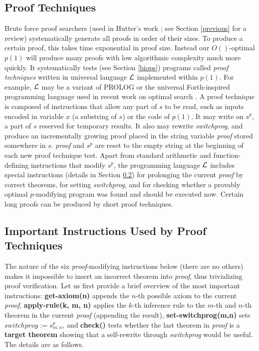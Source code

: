 \subsection{Proof Techniques}
\label{prooftech}
Brute force proof searchers
(used in Hutter's work \cite{Hutter:01aixi+,Hutter:01fast+}; 
see Section \ref{previous} for a review)
systematically generate all proofs
in order of their sizes.  To produce a certain proof,
this takes time exponential in proof size.
Instead our $O()$-optimal $p(1)$ will produce many proofs
with low algorithmic complexity 
\cite{Solomonoff:64,Kolmogorov:65,LiVitanyi:97}
much more quickly. It systematically tests (see Section \ref{biops})
programs called
{\em proof techniques} written in universal language
$\cal L$ implemented within $p(1)$.  
For example, $\cal L$  may be a variant of PROLOG \cite{Prolog:87}
or the universal {\sc Forth}\cite{Forth:70}-inspired
programming language used in recent work on optimal search
\cite{Schmidhuber:04oops}.
A proof technique is composed
of instructions that allow any part of $s$ to be read, 
such as inputs encoded in variable $x$ (a substring of $s$) or
the code of $p(1)$. It may write on $s^p$, a  part of $s$ reserved for 
temporary results.  It also may rewrite {\em switchprog}, 
and produce an incrementally growing proof placed in the
string variable {\em proof} stored somewhere in $s$.
{\em proof} and $s^p$ are reset to the empty string at 
the beginning of each new proof technique test.
Apart from standard arithmetic and function-defining instructions 
\cite{Schmidhuber:04oops} that modify $s^p$,
the programming language $\cal L$ includes special instructions
(details in Section \ref{instructions})
for prolonging the current {\em proof} by correct theorems,
for setting {\em switchprog},
and for checking whether a provably optimal $p$-modifying
program was found and should be executed now.
Certain long proofs can be produced by short proof techniques.

\subsection{Important Instructions Used by Proof Techniques}
\label{instructions}

The nature of the six {\em proof}-modifying instructions below
(there are no others)  
makes it impossible to insert an 
incorrect theorem into {\em proof},
thus trivializing proof verification.
Let us first provide a brief overview of the most
important instructions: {\bf get-axiom(n)}
appends the $n$-th possible axiom
to the current {\em proof}, 
{\bf apply-rule(k, m, n)} applies the $k$-th
inference rule to the $m$-th and $n$-th theorem
in the current {\em proof} (appending the result),
{\bf set-switchprog(m,n)}
sets $switchprog:= s^p_{m:n}$, 
and {\bf check()}
tests whether the last theorem in {\em proof}
is a {\bf target theorem} showing that a self-rewrite
through {\em switchprog} would be useful.
The details are as follows.


